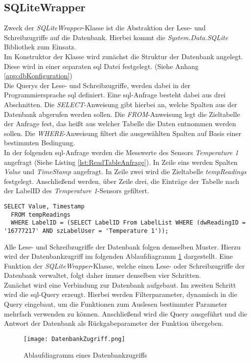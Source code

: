 \subsection*{SQLiteWrapper}
Zweck der \textit{SQLiteWrapper}-Klasse ist die Abstraktion der Lese- und Schreibzugriffe auf die Datenbank.  Hierbei kommt die \textit{System.Data.SQLite} Bibliothek zum Einsatz. \\
Im Konstruktor der Klasse wird zunächst die Struktur der Datenbank angelegt. Diese wird in einer separaten \ac{sql} Datei festgelegt. (Siehe Anhang \ref{app:dbKonfiguration})\\
Die Querys der Lese- und Schreibzugriffe, werden dabei in der Programmiersprache \ac{sql} definiert. Eine \ac{sql}-Anfrage besteht dabei aus drei Abschnitten. Die \textit{SELECT}-Anweisung gibt hierbei an, welche Spalten aus der Datenbank abgerufen werden sollen. Die \textit{FROM}-Anweisung legt die Zieltabelle der Anfrage fest, das heißt aus welcher Tabelle die Daten entnommen werden sollen. Die \textit{WHERE}-Anweisung filtert die ausgewählten Spalten auf Basis einer bestimmten Bedingung.\\
In der folgenden \ac{sql}-Anfrage werden die Messwerte des Sensors \textit{Temperature 1} angefragt (Siehe Listing \ref{lst:ReadTableAnfrage}). In Zeile eins werden Spalten \textit{Value} und \textit{TimeStamp} angefragt. In Zeile zwei wird die Zieltabelle \textit{tempReadings} festgelegt. Anschließend werden, über Zeile drei, die Einträge der Tabelle nach der LabelID des \textit{Temperature 1}-Sensors gefiltert.  
\begin{lstlisting}[caption={Query Anfrage zum Auslesen eines bestimmten Sensorwertes}, label={lst:ReadTableAnfrage}]
  SELECT Value, Timestamp 
  FROM tempReadings 
  WHERE LabelID = (SELECT LabelID From LabelList WHERE (dwReadingID = '16777217' AND szLabelUser = 'Temperature 1'));
\end{lstlisting}

Alle Lese- und Schreibzugriffe der Datenbank folgen demselben Muster. Hierzu wird der Datenbankzugriff im folgenden Ablaufdiagramm \ref{fig:Datenbankzugriff} dargestellt. Eine Funktion der \textit{SQLiteWrapper}-Klasse, welche einen Lese- oder Schreibzugriffe der Datenbank verwaltet, folgt daher immer denselben vier Schritten.\\
Zunächst wird eine Verbindung zur Datenbank aufgebaut. Im zweiten Schritt wird die \ac{sql}-Query erzeugt. Hierbei werden Filterparameter, dynamisch in die Query eingebaut, um die Funktionen zum Auslesen bestimmter Parameter mehrfach verwenden zu können. Anschließend wird die Query ausgeführt und die Antwort der Datenbank als Rückgabeparameter der Funktion übergeben.   
\begin{center}
  \begin{figure}[h!]
    \captionsetup{justification=centering,format=plain, font=small}
      \centering
      \texttt{[image: DatenbankZugriff.png]}
      \caption{Ablaufdiagramm eines Datenbankzugriffs}
      \label{fig:Datenbankzugriff}
  \end{figure}
\end{center}